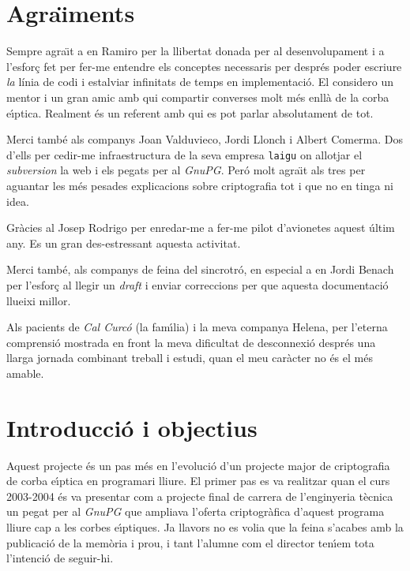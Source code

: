 \documentclass[12pt,twoside,catalan,a4paper]{book}%
\numberwithin{figure}{section}		%
\theoremstyle{definition}   			%
\def\ce{corba e\lgem{}\'{\i}ptica}%
\def\ces{corbes e\lgem{}\'{\i}ptiques}%
\theoremstyle{saltolinea}   			%
\begin{document}
\chapter*{Agra\"{\i}ments}

Sempre agra\"{\i}t a en Ramiro per la llibertat donada per al desenvolupament i a l'esfor\c{c} fet per fer-me entendre els conceptes necessaris per despr\'es poder escriure \emph{la} línia de codi i estalviar infinitats de temps en implementaci\'o. El considero un mentor i un gran amic amb qui compartir converses molt m\'es enll\`a de la \ce{}. Realment \'es un referent amb qui es pot parlar absolutament de tot.

Merci tamb\'e als companys Joan Valduvieco, Jordi Llonch i Albert Comerma. Dos d'ells per cedir-me infraestructura de la seva empresa {\tt laigu} on allotjar el \emph{subversion} la web i els pegats per al \emph{GnuPG}. Per\'o molt agra\"{\i}t als tres per aguantar les m\'es pesades explicacions sobre criptografia tot i que no en tinga ni idea.

Gr\`acies al Josep Rodrigo per enredar-me a fer-me pilot d'avionetes aquest \'ultim any. Es un gran des-estressant aquesta activitat.

Merci tamb\'e, als companys de feina del sincrotr\'o, en especial a en Jordi Benach per l'esfor\c{c} al llegir un \emph{draft} i enviar correccions per que aquesta documentaci\'o llueixi millor.

Als pacients de \emph{Cal Curc\'o} (la fam\'{\i}lia) i la meva companya Helena, per l'eterna comprensi\'o mostrada en front la meva dificultat de desconnexi\'o despr\'es una llarga jornada combinant treball i estudi, quan el meu car\`acter no \'es el m\'es amable.

\chapter{Introducci\'o i objectius}\label{ch:IntroObj}

Aquest projecte \'es un pas m\'es en l'evoluci\'o d'un projecte major de criptografia de \ce{} en programari lliure. El primer pas es va realitzar quan el curs 2003-2004 \'es va presentar \cite{BM04} com a projecte final de carrera de l'enginyeria t\`ecnica un pegat per al \emph{GnuPG} que ampliava l'oferta criptogr\`afica d'aquest programa lliure cap a les \ces{}. Ja llavors no es volia que la feina s'acabes amb la publicaci\'o de la mem\`oria i prou, i tant l'alumne com el director ten\'{\i}em tota l'intenci\'o de seguir-hi.
\end{document}
